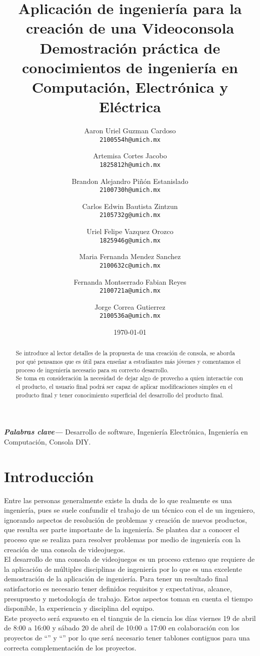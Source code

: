 \documentclass[letterpaper]{article}
\title{
    {\Huge Aplicación de ingeniería para la creación de una Videoconsola}\\
    {\LARGE Demostración práctica de conocimientos de ingeniería en
    Computación, Electrónica y Eléctrica}
}
\author{
    Aaron Uriel Guzman Cardoso\\
    \texttt{2100554h@umich.mx}
    \and
    Artemisa Cortes Jacobo\\
    \texttt{1825812h@umich.mx}
    \and
    Brandon Alejandro Piñón Estanislado\\
    \texttt{2100730h@umich.mx}
    \and
    Carlos Edwin Bautista Zintzun\\
    \texttt{2105732g@umich.mx}
    \and
    Uriel Felipe Vazquez Orozco\\
    \texttt{1825946g@umich.mx}
    \and
    Maria Fernanda Mendez Sanchez\\
    \texttt{2100632c@umich.mx}
    \and
    Fernanda Montserrado Fabian Reyes\\
    \texttt{2100721a@umich.mx}
    \and
    Jorge Correa Gutierrez\\
    \texttt{2100536a@umich.mx}
}
\date{\today}
\begin{document}
\maketitle

\begin{multicols}{2}

\begin{abstract}
    Se introduce al lector detalles de la propuesta de una creación de
    consola, se aborda por qué pensamos que es útil para enseñar a estudiantes
    más jóvenes y comentamos el proceso de ingeniería necesario para su
    correcto desarrollo.\\
    Se toma en consideración la necesidad de dejar algo de provecho a quien
    interactúe con el producto, el usuario final podrá ser capaz de aplicar
    modificaciones simples en el producto final y tener conocimiento
    superficial del desarrollo del producto final.
\end{abstract}

\textbf{\textit{Palabras clave—}} Desarrollo de software, Ingeniería Electrónica,
Ingeniería en Computación, Consola DIY.

\section{Introducción}
Entre las personas generalmente existe la duda de lo que realmente es una
ingeniería, pues se suele confundir el trabajo de un técnico con el de un
ingeniero, ignorando aspectos de resolución de problemas y creación de nuevos
productos, que resulta ser parte importante de la ingeniería. Se plantea dar
a conocer el proceso que se realiza para resolver problemas por medio de
ingeniería con la creación de una consola de videojuegos.\\
El desarrollo de una consola de videojuegos es un proceso extenso que
requiere de la aplicación de múltiples disciplinas de ingeniería por lo que
es una excelente demostración de la aplicación de ingeniería. Para tener un
resultado final satisfactorio es necesario tener definidos requisitos y
expectativas, alcance, presupuesto y metodología de trabajo. Estos
aspectos toman en cuenta el tiempo disponible, la experiencia y disciplina del
equipo.\\
Este proyecto será expuesto en el tianguis de la ciencia los días viernes
19 de abril de 8:00 a 16:00 y sábado 20 de abril de 10:00 a 17:00 en
colaboración con los proyectos de ``'' y ``'' por lo que será necesario tener
tablones contiguos para una correcta complementación de los proyectos.


\end{multicols}
\end{document}
